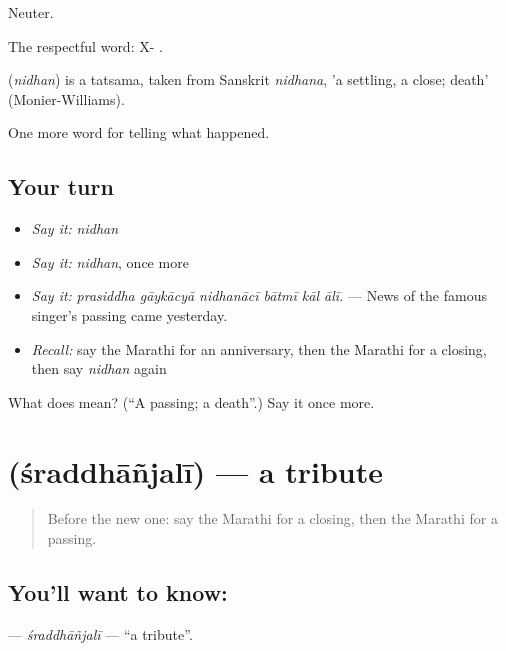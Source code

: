 Neuter.

The respectful word: X-  .

\begin{cousinweb}
\textbf{} (\emph{nidhan}) is a tatsama, taken from Sanskrit \emph{nidhana}, 'a settling, a close; death' (Monier-Williams).
\end{cousinweb}

\begin{grammarlens}[title={What you've built}]
One more word for telling what happened.
\end{grammarlens}

\subsection*{Your turn}
\begin{itemize}
\raggedright
  \item \emph{Say it:} \emph{nidhan}
  \item \emph{Say it:} \emph{nidhan}, once more
  \item \emph{Say it:} \emph{prasiddha gāykācyā nidhanācī bātmī kāl ālī.} — News of the famous singer's passing came yesterday.
  \item \emph{Recall:} say the Marathi for an anniversary, then the Marathi for a closing, then say \emph{nidhan} again
\end{itemize}

\begin{tcolorbox}[breakable,colback=teal!4,colframe=teal!35!black,title={Before you move on}]
What does  mean? (\textquotedblleft{}A passing; a death\textquotedblright{}.) Say it once more.
\end{tcolorbox}
\section[\texorpdfstring{\mr{श्रद्धांजली} (śraddhāñjalī)}{श्रद्धांजली (śraddhāñjalī)}]{ (śraddhāñjalī) — a tribute}

\label{lesson:MR-C324-sraddhanjali}



\begin{quote}
Before the new one: say the Marathi for a closing, then the Marathi for a passing.
\end{quote}

\subsection*{You'll want to know: }
\textbf{} — \emph{śraddhāñjalī} — \textquotedblleft{}a tribute\textquotedblright{}.

